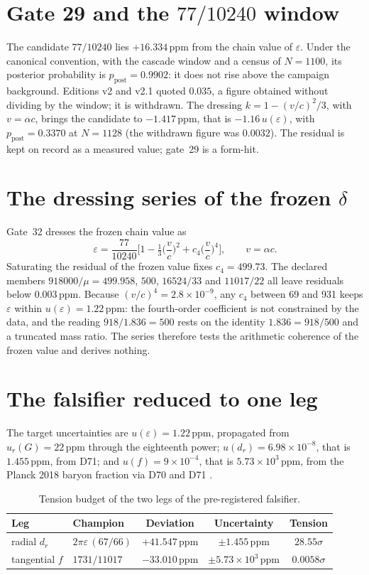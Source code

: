 \documentclass[11pt,a4paper]{article}
\newcommand{\ppm}{\ensuremath{\,\mathrm{ppm}}}
\begin{document}
\section{Gate 29 and the $77/10240$ window}
The candidate $77/10240$ lies $+16.334\ppm$ from the chain value of $\varepsilon$. Under the canonical convention, with the cascade window and a census of $N = 1100$, its posterior probability is $p_{\mathrm{post}} = 0.9902$: it does not rise above the campaign background. Editions v2 and v2.1 quoted $0.035$, a figure obtained without dividing by the window; it is withdrawn. The dressing $k = 1-(v/c)^2/3$, with $v = \alpha c$, brings the candidate to $-1.417\ppm$, that is $-1.16\,u(\varepsilon)$, with $p_{\mathrm{post}} = 0.3370$ at $N = 1128$ (the withdrawn figure was $0.0032$). The residual is kept on record as a measured value; gate~29 is a form-hit.

\section{The dressing series of the frozen $\delta$}\label{sec:delta}
Gate~32 dresses the frozen chain value as
\begin{equation}
\varepsilon = \frac{77}{10240}\Big[1 - \tfrac13\Big(\frac{v}{c}\Big)^2 + c_4\Big(\frac{v}{c}\Big)^4\Big], \qquad v = \alpha c .
\end{equation}
Saturating the residual of the frozen value fixes $c_4 = 499.73$. The declared members $918000/\mu = 499.958$, $500$, $16524/33$ and $11017/22$ all leave residuals below $0.003\ppm$. Because $(v/c)^4 = 2.8\times10^{-9}$, any $c_4$ between 69 and 931 keeps $\varepsilon$ within $u(\varepsilon) = 1.22\ppm$: the fourth-order coefficient is not constrained by the data, and the reading $918/1.836 = 500$ rests on the identity $1.836 = 918/500$ and a truncated mass ratio. The series therefore tests the arithmetic coherence of the frozen value and derives nothing.

\section{The falsifier reduced to one leg}
The target uncertainties are $u(\varepsilon) = 1.22\ppm$, propagated from $u_r(G) = 22\ppm$ through the eighteenth power; $u(d_r) = 6.98\times10^{-8}$, that is $1.455\ppm$, from D71; and $u(f) = 9\times10^{-4}$, that is $5.73\times10^{3}\ppm$, from the Planck 2018 baryon fraction via D70 and D71 \citep{planck2018,d70,d71}.

\begin{table}[h]\centering\small
\caption{Tension budget of the two legs of the pre-registered falsifier.}
\label{tab:tensions}
\begin{tabular}{@{}llccc@{}}
\toprule
Leg & Champion & Deviation & Uncertainty & Tension \\
\midrule
radial $d_r$ & $2\pi\varepsilon\,(67/66)$ & $+41.547\ppm$ & $\pm 1.455\ppm$ & $28.55\sigma$ \\
tangential $f$ & $1731/11017$ & $-33.010\ppm$ & $\pm 5.73\times10^{3}\ppm$ & $0.0058\sigma$ \\
\bottomrule
\end{tabular}
\end{table}
\end{document}
